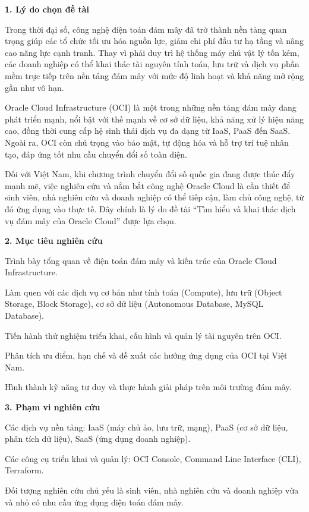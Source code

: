 
\textbf{1. Lý do chọn đề tài}

Trong thời đại số, công nghệ điện toán đám mây đã trở thành nền tảng quan trọng giúp các tổ chức tối ưu hóa nguồn lực, giảm chi phí đầu tư hạ tầng và nâng cao năng lực cạnh tranh. Thay vì phải duy trì hệ thống máy chủ vật lý tốn kém, các doanh nghiệp có thể khai thác tài nguyên tính toán, lưu trữ và dịch vụ phần mềm trực tiếp trên nền tảng đám mây với mức độ linh hoạt và khả năng mở rộng gần như vô hạn.

Oracle Cloud Infrastructure (OCI) là một trong những nền tảng đám mây đang phát triển mạnh, nổi bật với thế mạnh về cơ sở dữ liệu, khả năng xử lý hiệu năng cao, đồng thời cung cấp hệ sinh thái dịch vụ đa dạng từ IaaS, PaaS đến SaaS. Ngoài ra, OCI còn chú trọng vào bảo mật, tự động hóa và hỗ trợ trí tuệ nhân tạo, đáp ứng tốt nhu cầu chuyển đổi số toàn diện.

Đối với Việt Nam, khi chương trình chuyển đổi số quốc gia đang được thúc đẩy mạnh mẽ, việc nghiên cứu và nắm bắt công nghệ Oracle Cloud là cần thiết để sinh viên, nhà nghiên cứu và doanh nghiệp có thể tiếp cận, làm chủ công nghệ, từ đó ứng dụng vào thực tế. Đây chính là lý do đề tài “Tìm hiểu và khai thác dịch vụ đám mây của Oracle Cloud” được lựa chọn.

\textbf{2. Mục tiêu nghiên cứu}

Trình bày tổng quan về điện toán đám mây và kiến trúc của Oracle Cloud Infrastructure.

Làm quen với các dịch vụ cơ bản như tính toán (Compute), lưu trữ (Object Storage, Block Storage), cơ sở dữ liệu (Autonomous Database, MySQL Database).

Tiến hành thử nghiệm triển khai, cấu hình và quản lý tài nguyên trên OCI.

Phân tích ưu điểm, hạn chế và đề xuất các hướng ứng dụng của OCI tại Việt Nam.

Hình thành kỹ năng tư duy và thực hành giải pháp trên môi trường đám mây.

\textbf{3. Phạm vi nghiên cứu}

Các dịch vụ nền tảng: IaaS (máy chủ ảo, lưu trữ, mạng), PaaS (cơ sở dữ liệu, phân tích dữ liệu), SaaS (ứng dụng doanh nghiệp).

Các công cụ triển khai và quản lý: OCI Console, Command Line Interface (CLI), Terraform.


Đối tượng nghiên cứu chủ yếu là sinh viên, nhà nghiên cứu và doanh nghiệp vừa và nhỏ có nhu cầu ứng dụng điện toán đám mây.

